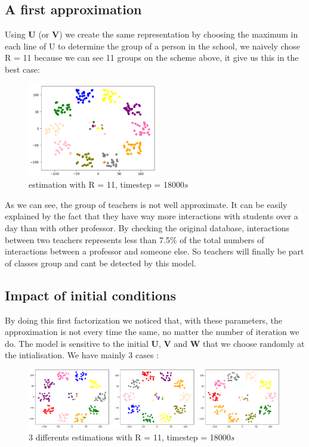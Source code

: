 \documentclass{article}
\begin{document}
\subsection{A first approximation}
Using $\mathbf{U}$ (or $\mathbf{V}$) we create the same representation by choosing the maximum in each line of U to determine the group of a person in the school,
we naively chose R = 11 because we can see 11 groups on the scheme above, it give us this in the best case:

\begin{figure}[H]
    \centering
    \includegraphics[width=0.5\textwidth]{images/naive_approach_r=11_t=18000.png}
    \caption{estimation with R = 11, timestep = 18000$s$}
\end{figure}

As we can see, the group of teachers is not well approximate. It can be easily explained by the fact that they have way more 
interactions with students over a day than with other professor. By checking the original database, interactions between two teachers 
represents less than 7.5\% of the total numbers of interactions between a professor and someone else. 
So teachers will finally be part of classes group and cant be detected by this model.\\

\subsection{Impact of initial conditions}
By doing this first factorization we noticed that, with these parameters, the approximation is not every time the same, 
no matter the number of iteration we do. The model is sensitive to the initial $\mathbf{U}$, $\mathbf{V}$ and $\mathbf{W}$ that we
choose randomly at the intialisation. We have mainly 3 cases :

\begin{figure}[H]
    \centering
    \includegraphics[width=1\textwidth]{images/3cases_of_convergence.png}
    \caption{3 differents estimations with R = 11, timestep = 18000$s$}
\end{figure}
\end{document}
